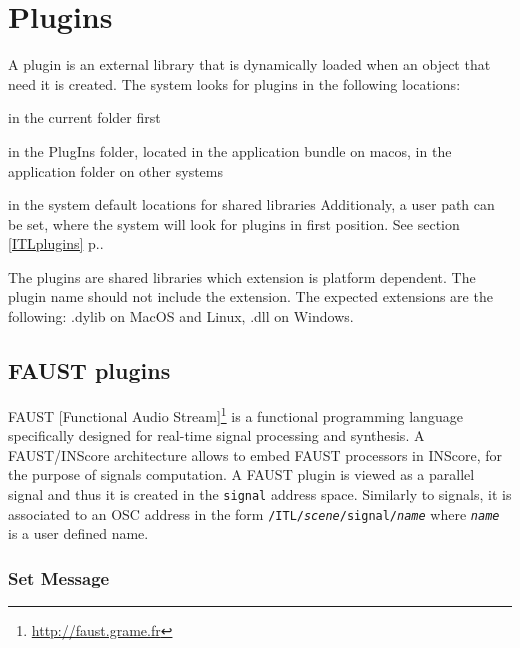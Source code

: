 \documentclass[a4paper,twoside]{report}
\newcommand{\toplevel}[1]	{\chapter{#1}}
\newcommand{\sublevel}[1]	{\section{#1}}
\newcommand{\subsublevel}[1]	{\subsection{#1}}
\newcommand{\fullref}[1]	{\ref{#1} p.\pageref{#1}}
\newcommand{\OSC}[1]		{\texttt{#1}}
\let\olditemize\itemize
\let\oldenditemize\enditemize
\renewenvironment{itemize} 	{\olditemize \setlength{\itemsep}{1mm}}{\oldenditemize}
\begin{document}
\toplevel{Plugins}
\label{plugins}

A plugin is an external library that is dynamically loaded when an object that need it is created.
The system looks for plugins in the following locations:
\begin{itemize}
\item in the current folder first
\item in the PlugIns folder, located in the application bundle on macos, in the application folder on other systems
\item in the system default locations for shared libraries
\end{itemize}
Additionaly, a user path can be set, where the system will look for plugins in first position. See section \fullref{ITLplugins}.

The plugins are shared libraries which extension is platform dependent. The plugin name should not include the extension. The expected extensions are the following: .dylib on MacOS and Linux, .dll on Windows.



\sublevel{FAUST plugins}
\label{faust}

FAUST [Functional Audio Stream]\footnote{\url{http://faust.grame.fr}} is a functional programming language specifically designed for real-time signal processing and synthesis. A FAUST/INScore architecture allows to embed FAUST processors in INScore, for the purpose of signals computation. A FAUST plugin is viewed as a parallel signal and thus it is created in the \OSC{signal} address space. Similarly to signals, it is associated to an OSC address in the form \OSC{/ITL/\emph{scene}/signal/\emph{name}} where \OSC{\emph{name}} is a user defined name.

\subsublevel{Set Message}
\end{document}
